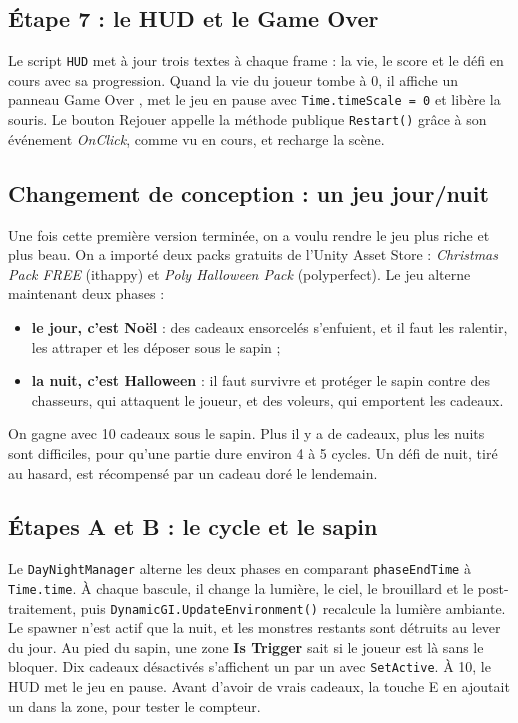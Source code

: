 \documentclass[11pt,a4paper]{article}
\begin{document}
\subsection{Étape 7 : le HUD et le Game Over}
Le script \texttt{HUD} met à jour trois textes à chaque frame : la vie, le score et le défi en cours avec sa progression. Quand la vie du joueur tombe à 0, il affiche un panneau \og Game Over \fg{}, met le jeu en pause avec \texttt{Time.timeScale = 0} et libère la souris. Le bouton \og Rejouer \fg{} appelle la méthode publique \texttt{Restart()} grâce à son événement \emph{OnClick}, comme vu en cours, et recharge la scène.

\subsection{Changement de conception : un jeu jour/nuit}
Une fois cette première version terminée, on a voulu rendre le jeu plus riche et plus beau. On a importé deux packs gratuits de l'Unity Asset Store : \emph{Christmas Pack FREE} (ithappy) et \emph{Poly Halloween Pack} (polyperfect). Le jeu alterne maintenant deux phases :
\begin{itemize}
  \item \textbf{le jour, c'est Noël} : des cadeaux ensorcelés s'enfuient, et il faut les ralentir, les attraper et les déposer sous le sapin ;
  \item \textbf{la nuit, c'est Halloween} : il faut survivre et protéger le sapin contre des chasseurs, qui attaquent le joueur, et des voleurs, qui emportent les cadeaux.
\end{itemize}
On gagne avec 10 cadeaux sous le sapin. Plus il y a de cadeaux, plus les nuits sont difficiles, pour qu'une partie dure environ 4 à 5 cycles. Un défi de nuit, tiré au hasard, est récompensé par un cadeau doré le lendemain.

\subsection{Étapes A et B : le cycle et le sapin}
Le \texttt{DayNightManager} alterne les deux phases en comparant \texttt{phaseEndTime} à \texttt{Time.time}. À chaque bascule, il change la lumière, le ciel, le brouillard et le post-traitement, puis \texttt{DynamicGI.UpdateEnvironment()} recalcule la lumière ambiante. Le spawner n'est actif que la nuit, et les monstres restants sont détruits au lever du jour. Au pied du sapin, une zone \textbf{Is Trigger} sait si le joueur est là sans le bloquer. Dix cadeaux désactivés s'affichent un par un avec \texttt{SetActive}. À 10, le HUD met le jeu en pause. Avant d'avoir de vrais cadeaux, la touche E en ajoutait un dans la zone, pour tester le compteur.
\end{document}
